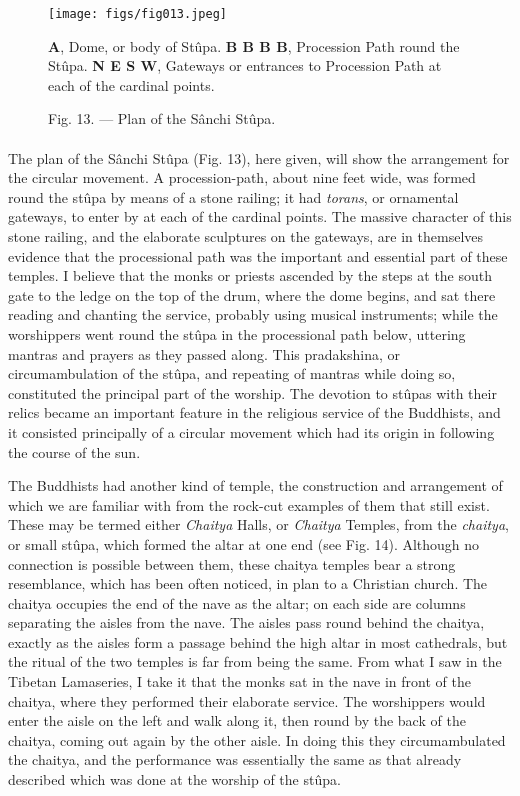 \documentclass[a4paper, 11pt, oneside, polutonikogreek, english]{article}
\begin{document}
\begin{figure}[H]
\centering
\texttt{[image: figs/fig013.jpeg]}
\caption{Fig. 13. --- Plan of the Sânchi Stûpa.}

\textbf{A}, Dome, or body of Stûpa. \textbf{B B B B}, Procession Path round the Stûpa. \textbf{N E S W}, Gateways or entrances to Procession Path at each of the cardinal points.
\end{figure}
\paragraph{}
The plan of the Sânchi Stûpa (Fig. 13), here given, will show the arrangement for the circular movement. A procession-path, about nine feet wide, was formed round the stûpa by means of a stone railing; it had \emph{torans}, or ornamental gateways, to enter by at each of the cardinal points. The massive character of this stone railing, and the elaborate sculptures on the gateways, are in themselves evidence that the processional path was the important and essential part of these temples. I believe that the monks or priests ascended by the steps at the south gate to the ledge on the top of the drum, where the dome begins, and sat there reading and chanting the service, probably using musical instruments; while the worshippers went round the stûpa in the processional path below, uttering mantras and prayers as they passed along. This pradakshina, or circumambulation of the stûpa, and repeating of mantras while doing so, constituted the principal part of the worship. The devotion to stûpas with their relics became an important feature in the religious service of the Buddhists, and it consisted principally of a circular movement which had its origin in following the course of the sun.

The Buddhists had another kind of temple, the construction and arrangement of which we are familiar with from the rock-cut examples of them that still exist. These may be termed either \emph{Chaitya} Halls, or \emph{Chaitya} Temples, from the \emph{chaitya}, or small stûpa, which formed the altar at one end (see Fig. 14). Although no connection is possible between them, these chaitya temples bear a strong resemblance, which has been often noticed, in plan to a Christian church. The chaitya occupies the end of the nave as the altar; on each side are columns separating the aisles from the nave. The aisles pass round behind the chaitya, exactly as the aisles form a passage behind the high altar in most cathedrals, but the ritual of the two temples is far from being the same. From what I saw in the Tibetan Lamaseries, I take it that the monks sat in the nave in front of the chaitya, where they performed their elaborate service. The worshippers would enter the aisle on the left and walk along it, then round by the back of the chaitya, coming out again by the other aisle. In doing this they circumambulated the chaitya, and the performance was essentially the same as that already described which was done at the worship of the stûpa.
\end{document}
